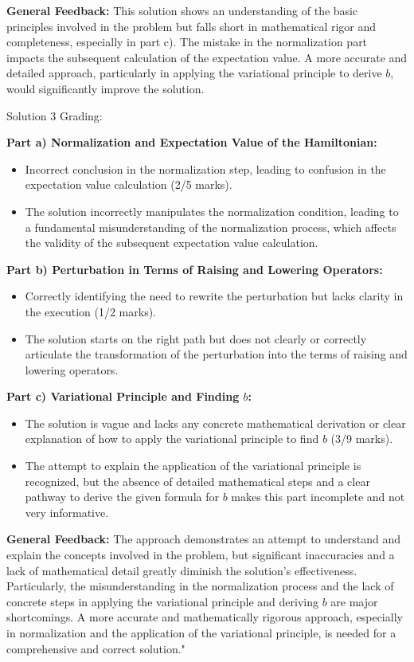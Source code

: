 \documentclass[a4paper,11pt]{article}
\begin{document}
\textbf{General Feedback:}
This solution shows an understanding of the basic principles involved in the problem but falls short in mathematical rigor and completeness, especially in part c). The mistake in the normalization part impacts the subsequent calculation of the expectation value. A more accurate and detailed approach, particularly in applying the variational principle to derive \( b \), would significantly improve the solution.

\hrulefill

Solution 3 Grading:

\textbf{Part a) Normalization and Expectation Value of the Hamiltonian:}
\begin{itemize}
    \item Incorrect conclusion in the normalization step, leading to confusion in the expectation value calculation (2/5 marks).
    \item The solution incorrectly manipulates the normalization condition, leading to a fundamental misunderstanding of the normalization process, which affects the validity of the subsequent expectation value calculation.
\end{itemize}

\textbf{Part b) Perturbation in Terms of Raising and Lowering Operators:}
\begin{itemize}
    \item Correctly identifying the need to rewrite the perturbation but lacks clarity in the execution (1/2 marks).
    \item The solution starts on the right path but does not clearly or correctly articulate the transformation of the perturbation into the terms of raising and lowering operators.
\end{itemize}

\textbf{Part c) Variational Principle and Finding \( b \):}
\begin{itemize}
    \item The solution is vague and lacks any concrete mathematical derivation or clear explanation of how to apply the variational principle to find \( b \) (3/9 marks).
    \item The attempt to explain the application of the variational principle is recognized, but the absence of detailed mathematical steps and a clear pathway to derive the given formula for \( b \) makes this part incomplete and not very informative.
\end{itemize}

\textbf{General Feedback:}
The approach demonstrates an attempt to understand and explain the concepts involved in the problem, but significant inaccuracies and a lack of mathematical detail greatly diminish the solution's effectiveness. Particularly, the misunderstanding in the normalization process and the lack of concrete steps in applying the variational principle and deriving \( b \) are major shortcomings. A more accurate and mathematically rigorous approach, especially in normalization and the application of the variational principle, is needed for a comprehensive and correct solution."
\end{document}
